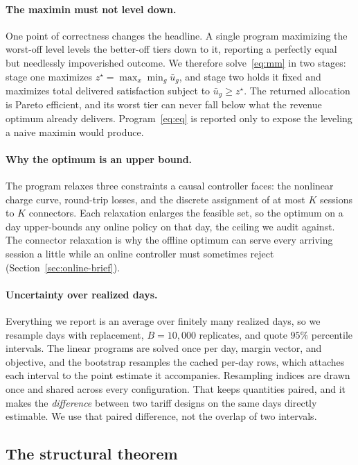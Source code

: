 \documentclass[manuscript, screen, review, anonymous]{acmart}
\begin{document}
\paragraph{The maximin must not level down.}
One point of correctness changes the headline. A single program maximizing the worst-off level levels the better-off tiers down to it, reporting a perfectly equal but needlessly impoverished outcome. We therefore solve~\eqref{eq:mm} in two stages: stage one maximizes $z^\star=\max_x\min_g\bar u_g$, and stage two holds it fixed and maximizes total delivered satisfaction subject to $\bar u_g\ge z^\star$. The returned allocation is Pareto efficient, and its worst tier can never fall below what the revenue optimum already delivers. Program~\eqref{eq:eq} is reported only to expose the leveling a naive maximin would produce.

\paragraph{Why the optimum is an upper bound.}
The program relaxes three constraints a causal controller faces: the nonlinear charge curve, round-trip losses, and the discrete assignment of at most $K$ sessions to $K$ connectors. Each relaxation enlarges the feasible set, so the optimum on a day upper-bounds any online policy on that day, the ceiling we audit against. The connector relaxation is why the offline optimum can serve every arriving session a little while an online controller must sometimes reject (Section~\ref{sec:online-brief}).

\paragraph{Uncertainty over realized days.}
\label{sec:bootstrap}
Everything we report is an average over finitely many realized days, so we resample days with replacement, $B=10{,}000$ replicates, and quote $95\%$ percentile intervals. The linear programs are solved once per day, margin vector, and objective, and the bootstrap resamples the cached per-day rows, which attaches each interval to the point estimate it accompanies. Resampling indices are drawn once and shared across every configuration. That keeps quantities paired, and it makes the \emph{difference} between two tariff designs on the same days directly estimable. We use that paired difference, not the overlap of two intervals.

\subsection{The structural theorem}
\label{sec:theorem}
\end{document}
